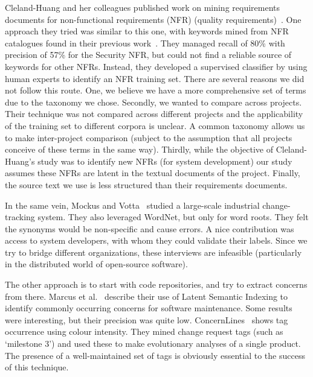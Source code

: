 \documentclass{acm_proc_article-sp}
\begin{document}
Cleland-Huang and her colleagues published work on mining requirements documents for non-functional requirements (NFR) (quality requirements)~\cite{Cleland-Huang2006}. One approach they tried was similar to this one, with keywords mined from NFR catalogues found in their previous work~\cite{chung99}. They managed recall of 80\% with precision of 57\% for the Security NFR, but could not find a reliable source of keywords for other NFRs. Instead, they developed a supervised classifier by using human experts to identify an NFR training set. There are several reasons we did not follow this route. One, we believe we have a more comprehensive set of terms due to the taxonomy we chose. Secondly, we wanted to compare across projects. Their technique was not compared across different projects and the applicability of the training set to different corpora is unclear. A common taxonomy allows us to make inter-project comparison (subject to the assumption that all projects conceive of these terms in the same way). Thirdly, while the objective of Cleland-Huang's study was to identify new NFRs (for system development) our study assumes these NFRs are latent in the textual documents of the project. Finally, the source text we use is less structured than their requirements documents.

In the same vein, Mockus and Votta~\cite{Mockus00} studied a large-scale industrial change-tracking system. They also leveraged WordNet, but only for word roots. They felt the synonyms would be non-specific and cause errors. A nice contribution was access to system developers, with whom they could validate their labels. Since we try to bridge different organizations, these interviews are infeasible (particularly in the distributed world of open-source software).

The other approach is to start with code repositories, and try to extract concerns from there. Marcus et al.~\cite{marcus04wcre} describe their use of Latent Semantic Indexing to identify commonly occurring concerns for software maintenance. Some results were interesting, but their precision was quite low. ConcernLines~\cite{treude09cl} shows tag occurrence using colour intensity. They mined change request tags (such as `milestone 3') and used these to make evolutionary analyses of a single product. The presence of a well-maintained set of tags is obviously essential to the success of this technique.
\end{document}
